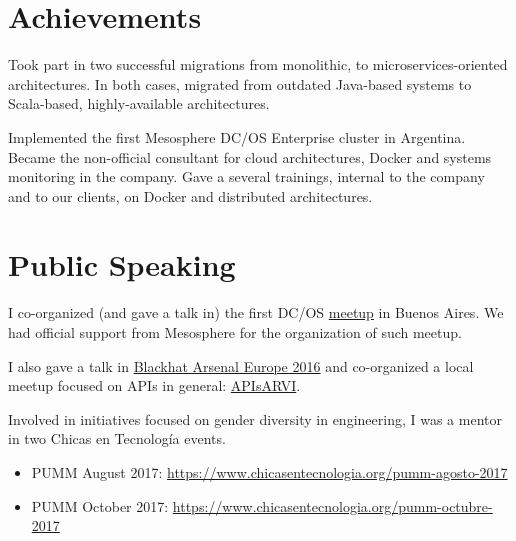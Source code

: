 \documentclass{vitae}
\begin{document}
\section*{Achievements}
Took part in two successful migrations from monolithic, to microservices-oriented architectures. In both cases, migrated from outdated Java-based systems to Scala-based, highly-available architectures.

Implemented the first Mesosphere DC/OS Enterprise cluster in Argentina. Became the non-official consultant for cloud architectures, Docker and systems monitoring in the company. Gave a several trainings, internal to the company and to our clients, on Docker and distributed architectures. 


\section*{Public Speaking}
I co-organized (and gave a talk in) the first DC/OS \href{https://www.meetup.com/es-ES/mesos-dcos-argentina/events/234352452/}{meetup} in Buenos Aires. We had official support from Mesosphere for the organization of such meetup.

I also gave a talk in \href{https://www.blackhat.com/eu-16/presenters/Nicolas-Villanueva.html}{Blackhat Arsenal Europe 2016} and co-organized a local meetup focused on APIs in general: \href{https://www.meetup.com/APIsAR/events/243084908/}{APIsARVI}.

Involved in initiatives focused on gender diversity in engineering, I was a mentor in two Chicas en Tecnología events.
\begin{itemize}[noitemsep]
    \item PUMM August 2017: \url{https://www.chicasentecnologia.org/pumm-agosto-2017}
    \item PUMM October 2017: \url{https://www.chicasentecnologia.org/pumm-octubre-2017}
\end{itemize}

\newpage
\end{document}
